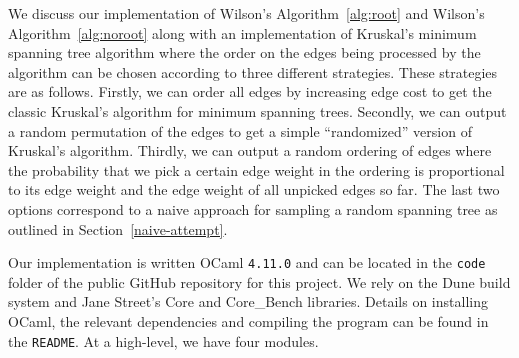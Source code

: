 \documentclass[11pt]{article}
\begin{document}
We discuss our implementation of Wilson's Algorithm~\ref{alg:root} and Wilson's Algorithm~\ref{alg:noroot} along with an implementation of Kruskal's minimum spanning tree algorithm where the order on the edges being processed by the algorithm can be chosen according to three different strategies. These strategies are as follows. Firstly, we can order all edges by increasing edge cost to get the classic Kruskal's algorithm for minimum spanning trees. Secondly, we can output a random permutation of the edges to get a simple ``randomized'' version of Kruskal's algorithm. Thirdly, we can output a random ordering of edges where the probability that we pick a certain edge weight in the ordering is proportional to its edge weight and the edge weight of all unpicked edges so far. The last two options correspond to a naive approach for sampling a random spanning tree as outlined in Section~\ref{naive-attempt}.

Our implementation is written OCaml \texttt{4.11.0} and can be located in the \texttt{code} folder of the public GitHub repository for this project. We rely on the Dune build system and Jane Street's Core and Core\_Bench libraries. \iffalse TO-DO: REFERENCES \fi Details on installing OCaml, the relevant dependencies and compiling the program can be found in the \texttt{README}. At a high-level, we have four modules.
\end{document}
